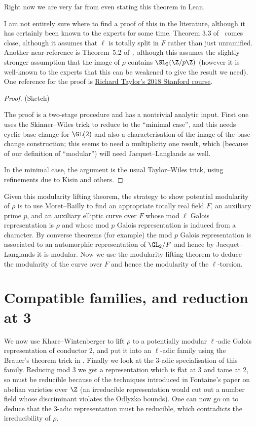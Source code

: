 Right now we are very far from even stating this theorem in Lean.

I am not entirely sure where to find a proof of this in the literature, although it has certainly been known to the experts for some time. Theorem 3.3 of~\cite{taylor-mero-cont} comes close, although it assumes that $\ell$ is totally split in $F$ rather than just unramified. Another near-reference is Theorem~5.2 of~\cite{toby-modularity}, although this assumes
the slightly stronger assumption that the image of $\rho$ contains $\SL_2(\Z/p\Z)$ (however it is well-known to the experts that this can be weakened to give the result we need). One reference for the proof is \href{https://math.berkeley.edu/~fengt/249A_2018.pdf}{Richard Taylor's 2018 Stanford course}.

\begin{proof} (Sketch)

The proof is a two-stage procedure and has a nontrivial analytic input. First one uses the Skinner--Wiles trick to reduce to the ``minimal case'', and this needs cyclic base change for $\GL(2)$ and also a characterisation
of the image of the base change construction; this seems to need a multiplicity one result, which (because of our
definition of ``modular'') will need Jacquet--Langlands as well.

In the minimal case, the argument is the usual Taylor--Wiles trick, using refinements due to Kisin and others.
\end{proof}

Given this modularity lifting theorem, the strategy to show potential modularity of $\rho$ is to use Moret--Bailly to find an appropriate totally real field $F$, an auxiliary prime $p$, and an auxiliary elliptic curve over $F$ whose mod $\ell$ Galois representation is $\rho$ and whose
mod $p$ Galois representation is induced from a character. By converse theorems (for example)
the mod $p$ Galois representation is associated to an automorphic representation of
$\GL_2/F$ and hence by Jacquet--Langlands it is modular. Now we use the
modularity lifting theorem to deduce the modularity of the curve over $F$ and hence
the modularity of the $\ell$-torsion.

\section{Compatible families, and reduction at 3}

\label{hardly_ramified_lift}
We now use Khare--Wintenberger to lift $\rho$ to a potentially modular $\ell$-adic
Galois representation of conductor 2, and
\label{hardly_ramified_compatible_family}
put it into an $\ell$-adic family using
the Brauer's theorem trick in \cite{blggt}. Finally we look at the 3-adic specialisation
of this family. Reducing mod 3 we get a representation which is flat at 3 and tame at 2,
so must be reducible because
of the techniques introduced in Fontaine's paper on abelian varieties over $\Z$ (an irreducible
representation would cut out a number field whose discriminant violates the Odlyzko bounds).
One can now go on to deduce that the 3-adic representation must be reducible, which
contradicts the irreducibility of $\rho$.

